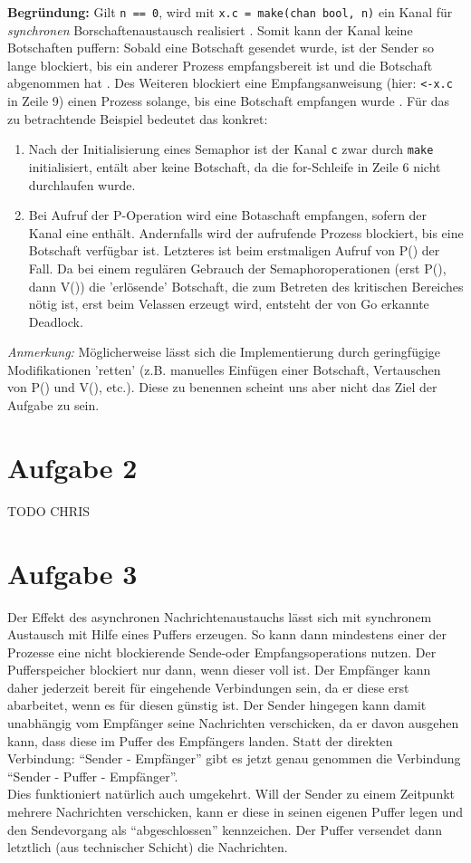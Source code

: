 \documentclass[11pt,a4paper,DIV=10,]{scrartcl}
\begin{document}
\textbf{Begründung:} Gilt \texttt{n == 0}, wird mit \texttt{x.c = make(chan bool, n)} ein Kanal für \textit{synchronen} Borschaftenaustausch realisiert \citep[vgl.][S. 168]{Maurer.2012}. Somit kann der Kanal keine Botschaften puffern: Sobald eine Botschaft gesendet wurde, ist der Sender so lange blockiert, bis ein anderer Prozess empfangsbereit ist und die Botschaft abgenommen hat \citep[vgl.][S. 166]{Maurer.2012}. Des Weiteren blockiert eine Empfangsanweisung (hier: \texttt{<-x.c} in Zeile 9) einen Prozess solange, bis eine Botschaft empfangen wurde \cite[vgl.][]{TourOfGo}. Für das zu betrachtende Beispiel bedeutet das konkret: 
\begin{enumerate}
\item Nach der Initialisierung eines Semaphor ist der Kanal \texttt{c} zwar durch \texttt{make} initialisiert, entält aber keine Botschaft, da die for-Schleife in Zeile 6 nicht durchlaufen wurde.
\item Bei Aufruf der P-Operation wird eine Botaschaft empfangen, sofern der Kanal eine enthält. Andernfalls wird der aufrufende Prozess blockiert, bis eine Botschaft verfügbar ist. Letzteres ist beim erstmaligen Aufruf von P() der Fall. Da bei einem regulären Gebrauch der Semaphoroperationen (erst P(), dann V()) die 'erlösende' Botschaft, die zum Betreten des kritischen Bereiches nötig ist, erst beim Velassen erzeugt wird, entsteht der von Go erkannte Deadlock. 
\end{enumerate}
\textit{Anmerkung:} Möglicherweise lässt sich die Implementierung durch geringfügige Modifikationen 'retten' (z.B. manuelles Einfügen einer Botschaft, Vertauschen von P() und V(), etc.). Diese zu benennen scheint uns aber nicht das Ziel der Aufgabe zu sein.
\section*{Aufgabe 2}

TODO CHRIS 
\section*{Aufgabe 3}
Der Effekt des asynchronen Nachrichtenaustauchs lässt sich mit synchronem Austausch mit Hilfe eines Puffers erzeugen. So kann dann mindestens einer der Prozesse eine nicht blockierende Sende-oder Empfangsoperations nutzen. Der Pufferspeicher blockiert nur dann, wenn dieser voll ist. Der Empfänger kann daher jederzeit bereit für eingehende Verbindungen sein, da er diese erst abarbeitet, wenn es für diesen günstig ist. Der Sender hingegen kann damit unabhängig vom Empfänger seine Nachrichten verschicken, da er davon ausgehen kann, dass diese im Puffer des Empfängers landen. 
Statt der direkten Verbindung: ``Sender - Empfänger'' gibt es jetzt genau genommen die Verbindung ``Sender - Puffer - Empfänger''.  \\
Dies funktioniert natürlich auch umgekehrt. Will der Sender zu einem Zeitpunkt mehrere Nachrichten verschicken, kann er diese in seinen eigenen Puffer legen und den Sendevorgang als ``abgeschlossen'' kennzeichen. Der Puffer versendet dann letztlich (aus technischer Schicht) die Nachrichten. 
\end{document}
